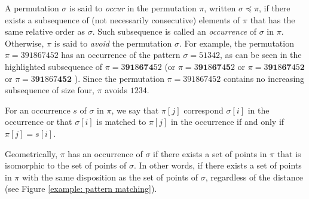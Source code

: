 \documentclass[a4paper]{llncs}
\begin{document}
A permutation $\sigma$ is said to \emph{occur} in the permutation $\pi$, written $\sigma \preceq \pi$,
if there exists a subsequence of (not necessarily consecutive)
elements of $\pi$ that has the same relative order as $\sigma$.
Such subsequence is called an \emph{occurrence} of $\sigma$ in $\pi$.
Otherwise, $\pi$ is said to \emph{avoid} the permutation $\sigma$.
For example, the permutation $\pi = 391867452$
has an occurrence of the pattern $\sigma = 51342$,
as can be seen in the highlighted subsequence of
$\pi = 3\mathbf{9}\mathbf{1}8\mathbf{6}\mathbf{7}\mathbf{4}52$
(or
$\pi = 3\mathbf{9}\mathbf{1}8\mathbf{6}\mathbf{7}4\mathbf{5}2$
or
$\pi = 3\mathbf{9}\mathbf{1}8\mathbf{6}\mathbf{7}45\textbf{2}$
or
$\pi = 3\mathbf{9}\mathbf{1}867\textbf{4}\textbf{5}\mathbf{2}$
).
Since the permutation $\pi = 391867452$  contains no increasing subsequence of
size four, $\pi$ avoids $1234$.

For an occurrence $s$ of $\sigma$ in $\pi$,
we say that $\pi[j]$ correspond $\sigma[i]$ in the occurrence or
that $\sigma[i]$ is matched to $\pi[j]$  in the occurrence
if and only if $\pi[j]=s[i]$.

Geometrically, $\pi$ has an occurrence of $\sigma$ if there exists
a set of points in $\pi$ that is isomorphic to the set of points of $\sigma$.
In other words,
if there exists a set of points in $\pi$ with the same disposition as the set of points of $\sigma$,
regardless of the distance (see Figure \ref{example: pattern matching}).
\end{document}
